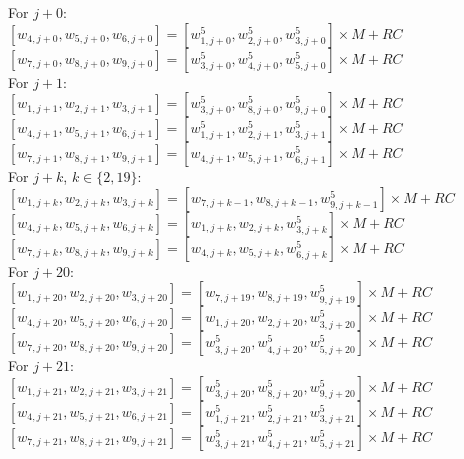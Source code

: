 \begin{center}
    For $j + 0$: \\
    $ [w_{4, j + 0}, w_{5, j + 0}, w_{6, j + 0}] = [w_{1, j + 0}^5, w_{2, j + 0}^5, w_{3, j + 0}^5] \times M + RC$ \\
    $ [w_{7, j + 0}, w_{8, j + 0}, w_{9, j + 0}] = [w_{3, j + 0}^5, w_{4, j + 0}^5, w_{5, j + 0}^5] \times M + RC$ \\
    For $j + 1$: \\
    $ [w_{1, j + 1}, w_{2, j + 1}, w_{3, j + 1}] = [w_{3, j + 0}^5, w_{8, j + 0}^5, w_{9, j + 0}^5] \times M + RC$ \\
    $ [w_{4, j + 1}, w_{5, j + 1}, w_{6, j + 1}] = [w_{1, j + 1}^5, w_{2, j + 1}^5, w_{3, j + 1}^5] \times M + RC$ \\
    $ [w_{7, j + 1}, w_{8, j + 1}, w_{9, j + 1}] = [w_{4, j + 1}, w_{5, j + 1}, w_{6, j + 1}^5] \times M + RC$ \\
    For $j + k$, $k \in \{2, 19\}$: \\
    $ [w_{1, j + k}, w_{2, j + k}, w_{3, j + k}] = [w_{7, j + k - 1}, w_{8, j + k - 1}, w_{9, j + k - 1}^5] \times M + RC$ \\
    $ [w_{4, j + k}, w_{5, j + k}, w_{6, j + k}] = [w_{1, j + k}, w_{2, j + k}, w_{3, j + k}^5] \times M + RC$ \\
    $ [w_{7, j + k}, w_{8, j + k}, w_{9, j + k}] = [w_{4, j + k}, w_{5, j + k}, w_{6, j + k}^5] \times M + RC$ \\
    For $j + 20$: \\
    $ [w_{1, j + 20}, w_{2, j + 20}, w_{3, j + 20}] = [w_{7, j + 19}, w_{8, j + 19}, w_{9, j + 19}^5] \times M + RC$ \\
    $ [w_{4, j + 20}, w_{5, j + 20}, w_{6, j + 20}] = [w_{1, j + 20}, w_{2, j + 20}, w_{3, j + 20}^5] \times M + RC$ \\
    $ [w_{7, j + 20}, w_{8, j + 20}, w_{9, j + 20}] = [w_{3, j + 20}^5, w_{4, j + 20}^5, w_{5, j + 20}^5] \times M + RC$ \\
    For $j + 21$: \\
    $ [w_{1, j + 21}, w_{2, j + 21}, w_{3, j + 21}] = [w_{3, j + 20}^5, w_{8, j + 20}^5, w_{9, j + 20}^5] \times M + RC$ \\
    $ [w_{4, j + 21}, w_{5, j + 21}, w_{6, j + 21}] = [w_{1, j + 21}^5, w_{2, j + 21}^5, w_{3, j + 21}^5] \times M + RC$ \\
    $ [w_{7, j + 21}, w_{8, j + 21}, w_{9, j + 21}] = [w_{3, j + 21}^5, w_{4, j + 21}^5, w_{5, j + 21}^5] \times M + RC$ \\
    
\end{center}

